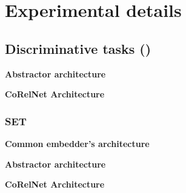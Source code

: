 \section{Experimental details}\label{sec:experimental_details}

\subsection{Discriminative tasks ()}

\textbf{Abstractor architecture}

\textbf{CoRelNet Architecture}



\subsubsection{SET}

\textbf{Common embedder's architecture}

\textbf{Abstractor architecture}

\textbf{CoRelNet Architecture}